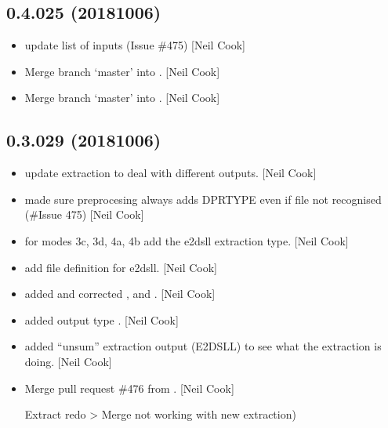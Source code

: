 \documentclass[a4paper,10pt,english]{report}
\begin{document}
\subsection{0.4.025 (2018\sphinxhyphen{}10\sphinxhyphen{}06)}
\label{\detokenize{misc/changelog:id321}}\begin{itemize}
\item {} 
 \sphinxhyphen{} update list of inputs (Issue \#475) {[}Neil Cook{]}

\item {} 
Merge branch ‘master’ into . {[}Neil Cook{]}

\item {} 
Merge branch ‘master’ into . {[}Neil Cook{]}

\end{itemize}


\subsection{0.3.029 (2018\sphinxhyphen{}10\sphinxhyphen{}06)}
\label{\detokenize{misc/changelog:id322}}\begin{itemize}
\item {} 
 \sphinxhyphen{} update extraction to deal with different
outputs. {[}Neil Cook{]}

\item {} 
 \sphinxhyphen{} made sure pre\sphinxhyphen{}procesing always adds DPRTYPE even if
file not recognised (\#Issue 475) {[}Neil Cook{]}

\item {} 
 \sphinxhyphen{} for modes 3c, 3d, 4a, 4b add the e2dsll extraction
type. {[}Neil Cook{]}

\item {} 
 \sphinxhyphen{} add file definition for e2dsll. {[}Neil Cook{]}

\item {} 
 \sphinxhyphen{} added and corrected ,  and
. {[}Neil Cook{]}

\item {} 
 \sphinxhyphen{} added output type . {[}Neil Cook{]}

\item {} 
 \sphinxhyphen{} added “un\sphinxhyphen{}sum” extraction output (E2DSLL)
to see what the extraction is doing. {[}Neil Cook{]}

\item {} 
Merge pull request \#476 from . {[}Neil Cook{]}

Extract redo \textendash{}\textgreater{} Merge  not working with new extraction)

\end{itemize}
\end{document}
